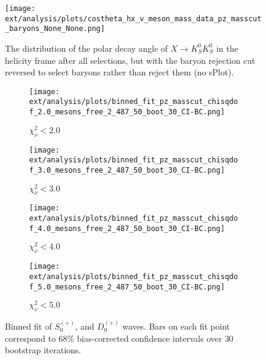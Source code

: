 \begin{figure}
  \begin{center}
    \texttt{[image: ext/analysis/plots/costheta\_hx\_v\_meson\_mass\_data\_pz\_masscut\_baryons\_None\_None.png]}
  \end{center}
  \caption{The distribution of the polar decay angle of $X \to K_S^0K_S^0$ in the helicity frame after all selections, but with the baryon rejection cut reversed to select baryons rather than reject them (no sPlot).}\label{fig:costheta-hx-v-meson-mass-data-pz-masscut-baryons}
\end{figure}


\begin{figure}[htbp]
    \centering
    \begin{subfigure}{0.45\textwidth}
        \texttt{[image: ext/analysis/plots/binned\_fit\_pz\_masscut\_chisqdof\_2.0\_mesons\_free\_2\_487\_50\_boot\_30\_CI-BC.png]}
        \caption{$\chi^2_\nu < 2.0$}
    \end{subfigure}
    \hfill
    \begin{subfigure}{0.45\textwidth}
        \texttt{[image: ext/analysis/plots/binned\_fit\_pz\_masscut\_chisqdof\_3.0\_mesons\_free\_2\_487\_50\_boot\_30\_CI-BC.png]}
        \caption{$\chi^2_\nu < 3.0$}
    \end{subfigure}
    \vspace{1em}
    \begin{subfigure}{0.45\textwidth}
        \texttt{[image: ext/analysis/plots/binned\_fit\_pz\_masscut\_chisqdof\_4.0\_mesons\_free\_2\_487\_50\_boot\_30\_CI-BC.png]}
        \caption{$\chi^2_\nu < 4.0$}
    \end{subfigure}
    \hfill
    \begin{subfigure}{0.45\textwidth}
        \texttt{[image: ext/analysis/plots/binned\_fit\_pz\_masscut\_chisqdof\_5.0\_mesons\_free\_2\_487\_50\_boot\_30\_CI-BC.png]}
        \caption{$\chi^2_\nu < 5.0$}
    \end{subfigure}

    \caption{Binned fit of $S_{0}^{(+)}$, and $D_{0}^{(+)}$ waves. Bars on each fit point correspond to $68\%$ bias-corrected confidence intervals over $ 30 $ bootstrap iterations.}
    \label{fig:binned-fit-all-Sp-D0p}
\end{figure}

